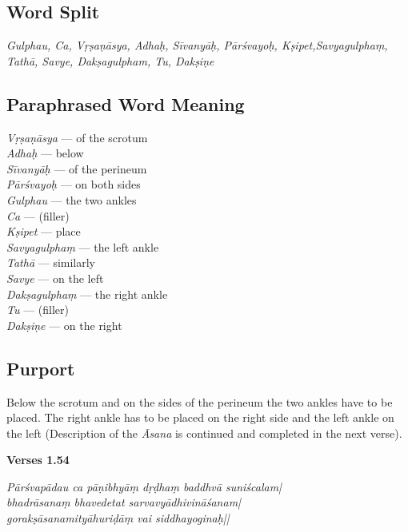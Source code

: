 \subsection*{Word Split}

\textit{Gulphau, Ca, Vṛṣaṇāsya, Adhaḥ, Sīvanyāḥ, Pārśvayoḥ, Kṣipet,Savyagulphaṃ, Tathā, Savye, Dakṣagulpham, Tu, Dakṣiṇe}

\subsection*{Paraphrased Word Meaning}

\begin{multicols}{2}
\textit{Vṛṣaṇāsya} ---  of the scrotum \\
\textit{Adhaḥ} ---  below  \\
\textit{Sīvanyāḥ} --- of the perineum   \\
\textit{Pārśvayoḥ} ---  on both sides  \\
\textit{Gulphau} ---  the two ankles  \\
\textit{Ca} ---   (filler) \\
\textit{Kṣipet} --- place  \\
\textit{Savyagulphaṃ} --- the left ankle  \\
\textit{Tathā} ---  similarly \\
\textit{Savye} ---  on the left  \\
\textit{Dakṣagulphaṃ} ---  the right ankle  \\
\textit{Tu} ---  (filler) \\
\textit{Dakṣiṇe} --- on the right 
\end{multicols}

\subsection*{Purport}

Below the scrotum and on the sides of the perineum the two ankles have to be placed. The right ankle has to be placed on the right side and the left ankle on the left (Description of the \textit{Āsana} is continued and completed in the next verse).

\newpage
\noindent \textbf{Verses 1.54}

\begin{shloka}
\textit{Pārśvapādau ca pāṇibhyāṃ dṛḍhaṃ baddhvā suniścalam|\\
bhadrāsanaṃ bhavedetat sarvavyādhivināśanam|\\
gorakṣāsanamityāhuriḍāṃ vai siddhayoginaḥ||}
\end{shloka}

